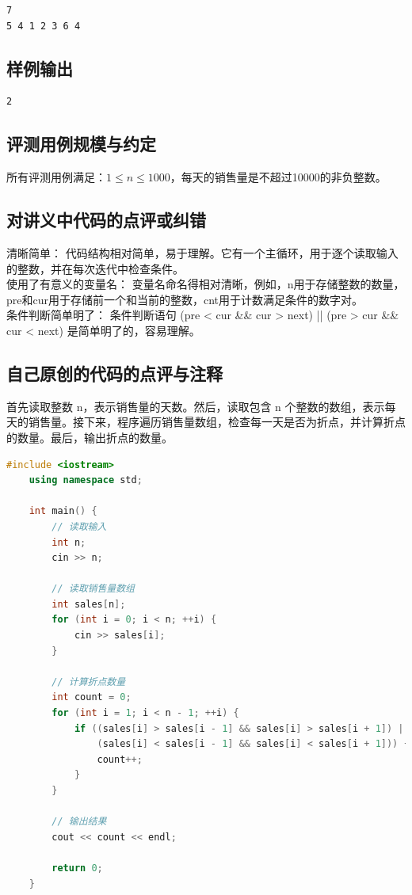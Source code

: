 \begin{lstlisting}[numbers=none]
7
5 4 1 2 3 6 4
\end{lstlisting}

\subsection{样例输出}

\begin{lstlisting}[numbers=none]
2
\end{lstlisting}

\subsection{评测用例规模与约定}

所有评测用例满足：$1\leq n\leq1000$，每天的销售量是不超过10000的非负整数。

\subsection{对讲义中代码的点评或纠错}
清晰简单： 代码结构相对简单，易于理解。它有一个主循环，用于逐个读取输入的整数，并在每次迭代中检查条件。\\
\indent
使用了有意义的变量名： 变量名命名得相对清晰，例如，n用于存储整数的数量，pre和cur用于存储前一个和当前的整数，cnt用于计数满足条件的数字对。\\
\indent 
条件判断简单明了： 条件判断语句 (pre < cur \&\& cur > next) || (pre > cur \&\& cur < next) 是简单明了的，容易理解。
\subsection{自己原创的代码的点评与注释}

首先读取整数 n，表示销售量的天数。然后，读取包含 n 个整数的数组，表示每天的销售量。接下来，程序遍历销售量数组，检查每一天是否为折点，并计算折点的数量。最后，输出折点的数量。

\begin{lstlisting}[language=C++]
    #include <iostream>
    using namespace std;
    
    int main() {
        // 读取输入
        int n;
        cin >> n;
    
        // 读取销售量数组
        int sales[n];
        for (int i = 0; i < n; ++i) {
            cin >> sales[i];
        }
    
        // 计算折点数量
        int count = 0;
        for (int i = 1; i < n - 1; ++i) {
            if ((sales[i] > sales[i - 1] && sales[i] > sales[i + 1]) ||
                (sales[i] < sales[i - 1] && sales[i] < sales[i + 1])) {
                count++;
            }
        }
    
        // 输出结果
        cout << count << endl;
    
        return 0;
    }        
\end{lstlisting}